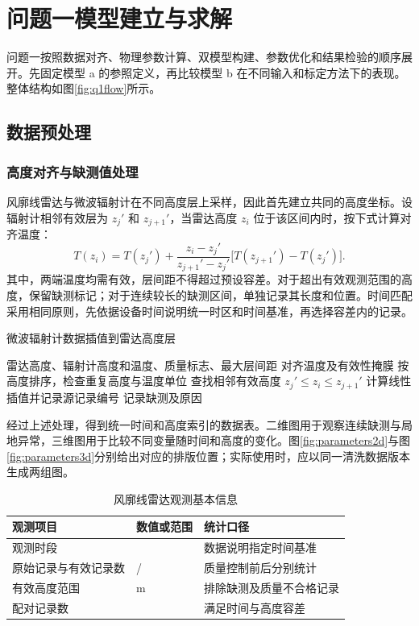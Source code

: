 \clearpage
\section{问题一模型建立与求解}
问题一按照数据对齐、物理参数计算、双模型构建、参数优化和结果检验的顺序展开。先固定模型 a 的参照定义，再比较模型 b 在不同输入和标定方法下的表现。整体结构如图\ref{fig:q1flow}所示。
\subsection{数据预处理}
\subsubsection{高度对齐与缺测值处理}
风廓线雷达与微波辐射计在不同高度层上采样，因此首先建立共同的高度坐标。设辐射计相邻有效层为 $z_j'$ 和 $z_{j+1}'$，当雷达高度 $z_i$ 位于该区间内时，按下式计算对齐温度：
\begin{equation}
T(z_i)=T(z_j')+\frac{z_i-z_j'}{z_{j+1}'-z_j'}\bigl[T(z_{j+1}')-T(z_j')\bigr].
\end{equation}
其中，两端温度均需有效，层间距不得超过预设容差。对于超出有效观测范围的高度，保留缺测标记；对于连续较长的缺测区间，单独记录其长度和位置。时间匹配采用相同原则，先依据设备时间说明统一时区和时间基准，再选择容差内的记录。
\begin{algorithm}[H]\caption{微波辐射计数据插值到雷达高度层}
\begin{algorithmic}[1]
\REQUIRE 雷达高度、辐射计高度和温度、质量标志、最大层间距
\ENSURE 对齐温度及有效性掩膜
\STATE 按高度排序，检查重复高度与温度单位
\STATE 查找相邻有效高度 $z_j'\le z_i\le z_{j+1}'$
\STATE 计算线性插值并记录源记录编号
\ELSE
\STATE 记录缺测及原因
\ENDIF
\ENDFOR
\end{algorithmic}\end{algorithm}
经过上述处理，得到统一时间和高度索引的数据表。二维图用于观察连续缺测与局地异常，三维图用于比较不同变量随时间和高度的变化。图\ref{fig:parameters2d}与图\ref{fig:parameters3d}分别给出对应的排版位置；实际使用时，应以同一清洗数据版本生成两组图。
\begin{table}[H]\centering\caption{风廓线雷达观测基本信息}
\begin{tabularx}{\linewidth}{lYY}\toprule
观测项目 & 数值或范围 & 统计口径\\\midrule
观测时段 &  & 数据说明指定时间基准\\
原始记录与有效记录数 &  /  & 质量控制前后分别统计\\
有效高度范围 &  m & 排除缺测及质量不合格记录\\
配对记录数 &  & 满足时间与高度容差\\\bottomrule
\end{tabularx}\end{table}
